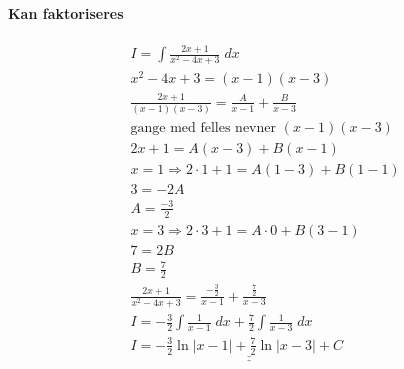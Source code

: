 \documentclass[defaultpackages]{cheatsheet}
\def\doubleunderline#1{\underline{\underline{#1}}}
\begin{document}
	\paragraph{Kan faktoriseres}
	\phantom{}
	\begin{align*}
		&I = \int \frac{2x+1}{x^2-4x+3}\;dx\\
		&x^2 - 4x + 3 = (x-1)(x-3)\\
		& \frac{2x+1}{(x-1)(x-3)} = \frac{A}{x-1}+\frac{B}{x-3}\\
		&\text{gange med felles nevner $(x-1)(x-3)$}\\
		&2x + 1 = A(x-3) + B(x-1)\\
		&x = 1 \Rightarrow 2\!\cdot\!1\!+\!1 = A(1\!-\!3) + B(1\!-\!1)\\
		& 3 = -2A\\
		& A = \frac{-3}{2}\\
		& x = 3 \Rightarrow 2 \cdot 3 + 1 = A\cdot 0 + B(3-1)\\
		& 7 = 2B\\
		& B = \frac{7}{2}\\
		& \frac{2x+1}{x^2-4x+3} = \frac{-\frac{3}{2}}{x-1} + \frac{\frac{7}{2}}{x-3}\\
		& I = -\frac{3}{2}\int \frac{1}{x-1}\;dx + \frac{7}{2}\int \frac{1}{x-3}\;dx\\
		& I = \doubleunderline{-\frac{3}{2} \ln |x-1| + \frac{7}{2}\ln|x-3|+C}
	\end{align*}
\end{document}
